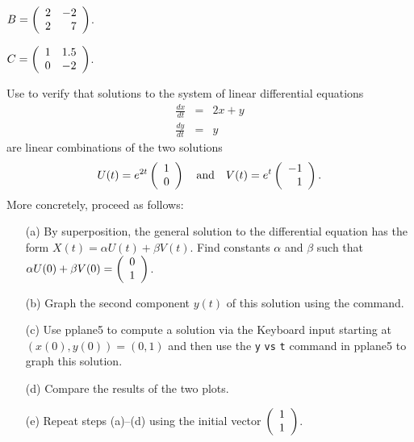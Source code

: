 \documentclass{ximera}
\begin{document}
\begin{exercise} \label{c4.5.5a}
$B=\left(\begin{array}{rr} 2 & -2\\ 2 &7\end{array}\right)$.
\end{exercise}
\begin{exercise} \label{c4.5.5b}
$C=\left(\begin{array}{rr} 1 & 1.5\\ 0 &-2\end{array}\right)$.
\end{exercise}

\begin{exercise} \label{c4.4.5}
Use \Matlab to verify that solutions to the system of linear differential
equations
\begin{eqnarray*}
\frac{dx}{dt} & = & 2x + y\\
\frac{dy}{dt} & = & y
\end{eqnarray*}
are linear combinations of the two solutions
\[
U(t) = e^{2t}\left(\begin{array}{r} 1 \\ 0\end{array}\right) \quad\mbox{and}\quad V(t) = e^{t}\left(\begin{array}{r} -1 \\ 1\end{array}\right).
\]
More concretely, proceed as follows:
\begin{itemize}
\item[(a)]  By superposition, the general solution to the differential
equation has the form $X(t)=\alpha U(t) + \beta V(t)$.  Find constants
$\alpha$ and $\beta$ such that $\alpha U(0) + \beta V(0) = \left(\begin{array}{r} 0 \\ 1\end{array}\right)$.
\item[(b)] Graph the second component $y(t)$ of this solution using the
 command.
\item[(c)] Use {\sf pplane5} to compute a solution via the {\sf Keyboard
input} starting at $(x(0),y(0)) = (0,1)$ and then use the
{\tt y} {\tt vs} {\tt t} command in {\sf pplane5} to graph this solution.
\item[(d)] Compare the results of the two plots.
\item[(e)]  Repeat steps (a)--(d) using the initial vector $\left(\begin{array}{r} 1 \\ 1\end{array}\right)$.
\end{itemize}
\end{exercise}
\end{document}
